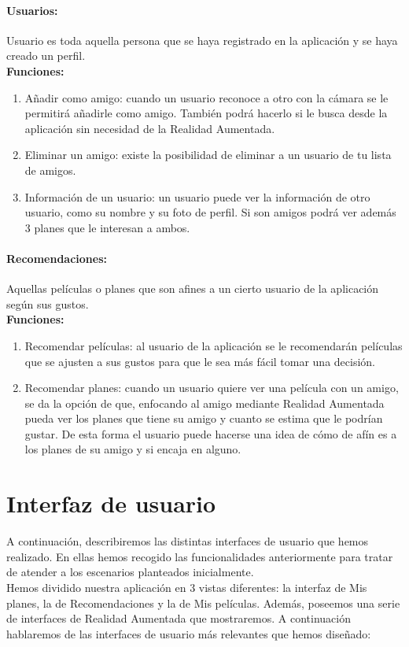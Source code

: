 \paragraph{\large Usuarios:\\}
Usuario es toda aquella persona que se haya registrado en la aplicación y se haya creado un perfil.
\\
\textbf{Funciones:}
\begin{enumerate}
    \item Añadir como amigo: cuando un usuario reconoce a otro con la cámara se le permitirá añadirle como amigo. También podrá hacerlo si le busca desde la aplicación sin necesidad de la Realidad Aumentada.
    \item Eliminar un amigo: existe la posibilidad de eliminar a un usuario de tu lista de amigos.
    \item Información de un usuario: un usuario puede ver la información de otro usuario, como su nombre y su foto de perfil. Si son amigos podrá ver además 3 planes que le interesan a ambos.
\end{enumerate} 

\paragraph{\large Recomendaciones:\\}
Aquellas películas o planes que son afines a un cierto usuario de la aplicación según sus gustos.
\\
\textbf{Funciones:}
\begin{enumerate}
    \item Recomendar películas: al usuario de la aplicación se le recomendarán películas que se ajusten a sus gustos para que le sea más fácil tomar una decisión.
    \item Recomendar planes: cuando un usuario quiere ver una película con un amigo, se da la opción de que, enfocando al amigo mediante Realidad Aumentada pueda ver los planes que tiene su amigo y 
    cuanto se estima que le podrían gustar. De esta forma el usuario puede hacerse una idea de cómo de afín es a los planes de su amigo y si encaja en alguno.
\end{enumerate} 

\section{Interfaz de usuario}
\label{makereference3.4}
A continuación, describiremos las distintas interfaces de usuario que hemos realizado. En ellas hemos recogido las funcionalidades anteriormente para tratar de atender a los escenarios planteados inicialmente.
\\
Hemos dividido nuestra aplicación en 3 vistas diferentes: la interfaz de Mis planes, la de Recomendaciones y la de Mis películas. Además, poseemos una serie de interfaces de Realidad Aumentada que mostraremos. A continuación hablaremos
de las interfaces de usuario más relevantes que hemos diseñado:
